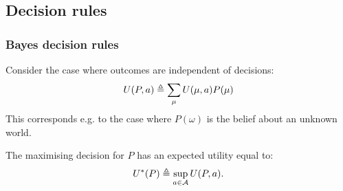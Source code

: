 \subsection{Decision rules}


\begin{frame}
  \frametitle{Bayes decision rules}
  Consider the case where outcomes are independent of decisions:
  \[
    U (P, a) \mathrel{\triangleq} \sum_{\mu}  U (\mu, a) P(\mu)
  \]
  This corresponds e.g. to the case where $P(\omega)$ is the belief about an unknown world.
  \begin{definition}
    \label{def:bayes-utility}
    The maximising decision for $P$ has an expected utility equal to:
    \begin{equation}
      U^*(P) \mathrel{\triangleq} \sup_{a \in \mathcal{A}} U (P, a).
      \label{eq:bayes-utility}
    \end{equation}
  \end{definition}
\end{frame}




